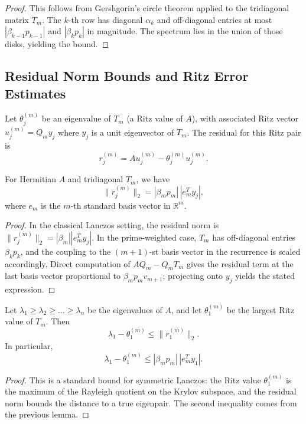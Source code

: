 \documentclass[11pt]{article}
\begin{document}
\begin{proof}
This follows from Gershgorin's circle theorem applied to the
tridiagonal matrix $T_m$.\cite{UrschelLanczos} The $k$-th row has
diagonal $\alpha_k$ and off-diagonal entries at most
$|\beta_{k-1}p_{k-1}|$ and $|\beta_k p_k|$ in magnitude. The spectrum
lies in the union of those disks, yielding the bound.
\end{proof}

\subsection{Residual Norm Bounds and Ritz Error Estimates}

Let $\theta^{(m)}_j$ be an eigenvalue of $T_m$ (a Ritz value of $A$),
with associated Ritz vector $u^{(m)}_j = Q_m y_j$ where $y_j$ is a unit
eigenvector of $T_m$. The residual for this Ritz pair is
\[
r^{(m)}_j = A u^{(m)}_j - \theta^{(m)}_j u^{(m)}_j.
\]

\begin{lemma}
For Hermitian $A$ and tridiagonal $T_m$, we have
\[
\|r^{(m)}_j\|_2 = |\beta_m p_m|\, |e_m^T y_j|,
\]
where $e_m$ is the $m$-th standard basis vector in $\mathbb{R}^m$.
\end{lemma}

\begin{proof}
In the classical Lanczos setting, the residual norm is
$\|r^{(m)}_j\|_2 = |\beta_m| |e_m^T y_j|$.\cite{LanczosAlgo,MITLanczos}
In the prime-weighted case, $T_m$ has off-diagonal entries $\beta_k p_k$,
and the coupling to the $(m+1)$-st basis vector in the recurrence is
scaled accordingly. Direct computation of
$A Q_m - Q_m T_m$ gives the residual term at the last basis vector
proportional to $\beta_m p_m v_{m+1}$; projecting onto $y_j$ yields the
stated expression.
\end{proof}

\begin{proposition}
Let $\lambda_1\ge\lambda_2\ge\dots\ge\lambda_n$ be the eigenvalues of
$A$, and let $\theta^{(m)}_1$ be the largest Ritz value of $T_m$.
Then
\[
\lambda_1 - \theta^{(m)}_1 \le \|r^{(m)}_1\|_2.
\]
In particular,
\[
\lambda_1 - \theta^{(m)}_1 \le |\beta_m p_m|\, |e_m^T y_1|.
\]
\end{proposition}

\begin{proof}
This is a standard bound for symmetric Lanczos: the Ritz value
$\theta^{(m)}_1$ is the maximum of the Rayleigh quotient on the Krylov
subspace, and the residual norm bounds the distance to a true
eigenpair.\cite{LanczosAlgo,UrschelLanczos} The second inequality comes
from the previous lemma.
\end{proof}
\end{document}
